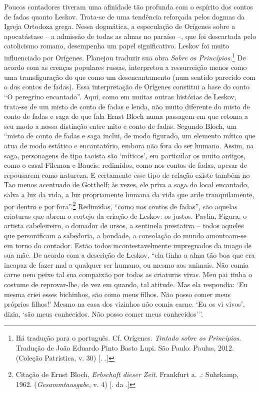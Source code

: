 Poucos contadores tiveram uma afinidade tão profunda com o espírito dos
contos de fadas quanto Leskov. Trata-se de uma tendência reforçada pelos
dogmas da Igreja Ortodoxa grega. Nessa dogmática, a especulação de
Orígenes sobre a apocatástase -- a admissão de todas as almas no paraíso
--, que foi descartada pelo catolicismo romano, desempenha um papel
significativo. Leskov foi muito influenciado por Orígenes. Planejou
traduzir sua obra \emph{Sobre os Princípios}.\footnote{Há tradução para
  o português. Cf. Orígenes. \emph{Tratado sobre os Princípios}.
  Tradução de João Eduardo Pinto Basto Lupi. São Paulo: Paulus, 2012.
  (Coleção Patrística, v. 30) [. .]} De acordo com as
crenças populares russas, interpretou a ressurreição menos como uma
transfiguração do que como um desencantamento (num sentido parecido com
o dos contos de fadas). Essa interpretação de Orígenes constitui a base
do conto ``O peregrino encantado''. Aqui, como em muitas outras
histórias de Leskov, trata-se de um misto de conto de fadas e lenda, não
muito diferente do misto de conto de fadas e saga de que fala Ernst
Bloch numa passagem em que retoma a seu modo a nossa distinção entre
mito e conto de fadas. Segundo Bloch, um ``misto de conto de fadas e
saga inclui, de modo figurado, um elemento mítico que atua de modo
estático e encantatório, embora não fora do ser humano. Assim, na saga,
personagens de tipo taoista são `míticos', em particular os muito
antigos, como o casal Filemon e Baucis: redimidos, como nos contos de
fadas, apesar de repousarem como natureza. E certamente esse tipo de
relação existe também no Tao menos acentuado de Gotthelf; às vezes, ele
priva a saga do local encantado, salva a luz da vida, a luz propriamente
humana da vida que arde tranquilamente, por dentro e por
fora''.\footnote{Citação de Ernst Bloch, \emph{Erbschaft dieser Zeit}.
  Frankfurt a. .: Suhrkamp, 1962. (\emph{Gesammtausgabe}, v. 4) [.
  da .]} Redimidas, ``como nos contos de fadas'', são aquelas
criaturas que abrem o cortejo da criação de Leskov: os justos. Pavlin,
Figura, o artista cabeleireiro, o domador de ursos, a sentinela
prestativa -- todos aqueles que personificam a sabedoria, a bondade, a
consolação do mundo amontoam-se em torno do contador. Estão todos
incontestavelmente impregnados da imago de sua mãe. De acordo com a
descrição de Leskov, ``ela tinha a alma tão boa que era incapaz de fazer
mal a qualquer ser humano, ou mesmo aos animais. Não comia carne nem
peixe tal sua compaixão por todas as criaturas vivas. Meu pai tinha o
costume de reprovar-lhe, de vez em quando, tal atitude. Mas ela
respondia: `Eu mesma criei esses bichinhos, são como meus filhos. Não
posso comer meus próprios filhos!' Mesmo na casa dos vizinhos não comia
carne. `Eu os vi vivos', dizia, `são meus conhecidos. Não posso comer
meus conhecidos'''.

